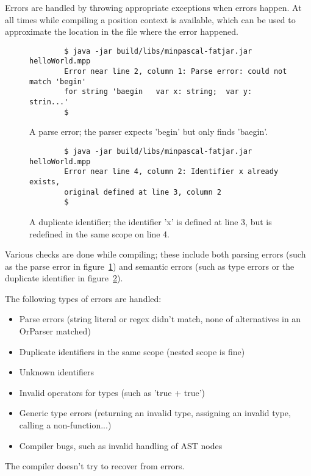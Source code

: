 \documentclass{article}
\begin{document}
Errors are handled by throwing appropriate exceptions when errors happen. At
all times while compiling a position context is available, which can be used
to approximate the location in the file where the error happened. 

\begin{figure}[ht!]
    \begin{verbatim}
        $ java -jar build/libs/minpascal-fatjar.jar helloWorld.mpp
        Error near line 2, column 1: Parse error: could not match 'begin'
        for string 'baegin   var x: string;  var y: strin...'
        $
    \end{verbatim}
    \caption{A parse error; the parser expects 'begin' but only finds 'baegin'.}
    \label{fig:parseerror}
\end{figure}

\begin{figure}[ht!]
    \begin{verbatim}
        $ java -jar build/libs/minpascal-fatjar.jar helloWorld.mpp
        Error near line 4, column 2: Identifier x already exists,
        original defined at line 3, column 2
        $
    \end{verbatim}
    \caption{A duplicate identifier; the identifier 'x' is defined at line 3,
    but is redefined in the same scope on line 4.}
    \label{fig:dupe}
\end{figure}

Various checks are done while compiling; these include both parsing errors (such
as the parse error in figure~\ref{fig:parseerror}) and semantic errors (such as
type errors or the duplicate identifier in figure~\ref{fig:dupe}).

The following types of errors are handled:
\begin{itemize}
    \item Parse errors (string literal or regex didn't match, none of
        alternatives in an OrParser matched)
    \item Duplicate identifiers in the same scope (nested scope is fine)
    \item Unknown identifiers
    \item Invalid operators for types (such as 'true + true')
    \item Generic type errors (returning an invalid type, assigning an invalid
        type, calling a non-function...)
    \item Compiler bugs, such as invalid handling of AST nodes
\end{itemize}

The compiler doesn't try to recover from errors.
\end{document}
